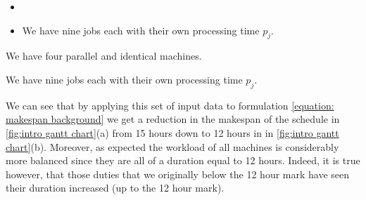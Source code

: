 \begin{itemize}
    \item \\
    \item We have nine jobs each with their own processing time $p_j$.\\
\end{itemize}

\vspace{\baselineskip}
{\addtolength{\leftskip}{5mm}
\noindent
We have four parallel and identical machines.\par

\vspace{\baselineskip}
\noindent
We have nine jobs each with their own processing time $p_j$.\par
 
}

\vspace{\baselineskip}
\noindent
We can see that by applying this set of input data to formulation \ref{equation: makespan background} we get a reduction in the makespan of the schedule in \ref{fig:intro gantt chart}(a) from 15 hours down to 12 hours in in \ref{fig:intro gantt chart}(b). Moreover, as expected the workload of all machines is considerably more balanced since they are all of a duration equal to 12 hours. Indeed, it is true however, that those duties that we originally below the 12 hour mark have seen their duration increased (up to the 12 hour mark).


